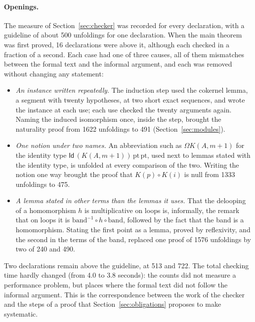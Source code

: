 \documentclass[11pt]{article}
\newcommand{\Id}{\mathsf{Id}}
\theoremstyle{remark}
\begin{document}
\paragraph{Openings.} The measure of Section~\ref{sec:checker} was
recorded for every declaration, with a guideline of about 500
unfoldings for one declaration. When the main theorem was first proved,
16 declarations were above it, although each checked in a fraction of
a second. Each case had one of three causes, all of them mismatches
between the formal text and the informal argument, and each was
removed without changing any statement:
\begin{itemize}
\item \emph{An instance written repeatedly.} The induction step used the
  cokernel lemma, a segment with twenty hypotheses, at two short exact
  sequences, and wrote the instance at each use; each use checked the
  twenty arguments again. Naming the induced isomorphism once, inside
  the step, brought the naturality proof from 1622 unfoldings to 491
  (Section~\ref{sec:modules}).
\item \emph{One notion under two names.} An abbreviation such as
  $\Omega K(A,m+1)$ for the identity type $\Id\,(K(A,m+1))\,\mathrm{pt}\,
  \mathrm{pt}$, used next to lemmas stated with the identity type, is
  unfolded at every comparison of the two. Writing the notion one way
  brought the proof that $K(p)\circ K(i)$ is null from 1333 unfoldings to
  475.
\item \emph{A lemma stated in other terms than the lemmas it uses.}
  That the delooping of a homomorphism $h$ is multiplicative on loops is,
  informally, the remark that on loops it is
  $\mathrm{band}^{-1}\circ h\circ\mathrm{band}$, followed by the fact that
  the band is a homomorphism. Stating the first point as a lemma, proved
  by reflexivity, and the second in the terms of the band, replaced one
  proof of 1576 unfoldings by two of 240 and 490.
\end{itemize}
Two declarations remain above the guideline, at 513 and 722. The total
checking time hardly changed (from 4.0 to 3.8 seconds): the counts did
not measure a performance problem, but places where the formal text did
not follow the informal argument. This is the correspondence between the
work of the checker and the steps of a proof that
Section~\ref{sec:obligations} proposes to make systematic.
\end{document}
